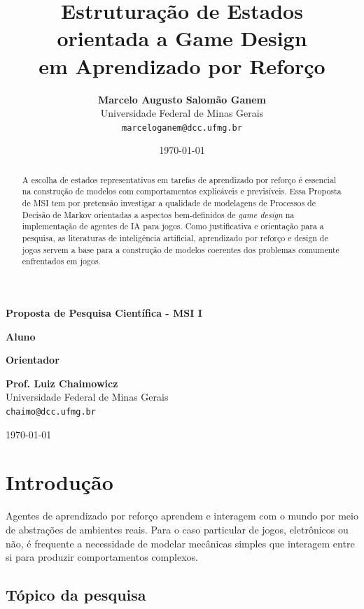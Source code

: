 \documentclass[10pt,a4paper]{article}
\title{Estruturação de Estados\\ orientada a Game Design\\ em Aprendizado por Reforço}
\author{{\bfseries Marcelo Augusto Salomão Ganem }\\ Universidade Federal de Minas Gerais\\
\texttt{marceloganem@dcc.ufmg.br}
}
\date{\today}
\begin{document}
\makeatletter
\begin{titlepage}
  \centering
  \vspace*{5.5cm}
    {\Large \bfseries Proposta de Pesquisa Científica - MSI I \par}
    \vspace{1cm}
    {\Huge \bfseries \@title \par}
  \vspace{1cm}
  \vspace{0.5cm}
    {\bfseries Aluno\par}
  {\Large \@author \par}
  \vspace{0.5cm}
    {\bfseries Orientador\par}
  {\Large {\bfseries Prof. Luiz Chaimowicz }\\ Universidade Federal de Minas Gerais\\\texttt{chaimo@dcc.ufmg.br} \par}

  \vfill {\large \today\par}
\end{titlepage}

\twocolumn
\begin{abstract}
    A escolha de estados representativos em tarefas de aprendizado por reforço é essencial na construção de modelos com comportamentos explicáveis e previsíveis. Essa Proposta de MSI tem por pretensão investigar a qualidade de modelagens de Processos de Decisão de Markov orientadas a aspectos bem-definidos de \textit{game design} na implementação de agentes de IA para jogos. Como justificativa e orientação para a pesquisa, as literaturas de inteligência artificial, aprendizado por reforço e design de jogos servem a base para a construção de modelos coerentes dos problemas comumente enfrentados em jogos.
\end{abstract}


\label{introduction}
\section{Introdução}

Agentes de aprendizado por reforço aprendem e interagem com o mundo por meio de abstrações de ambientes reais. Para o caso particular de jogos, eletrônicos ou não, é frequente a necessidade de modelar mecânicas simples que interagem entre si para produzir comportamentos complexos.

\label{topic}
\subsection{Tópico da pesquisa}
\end{document}

